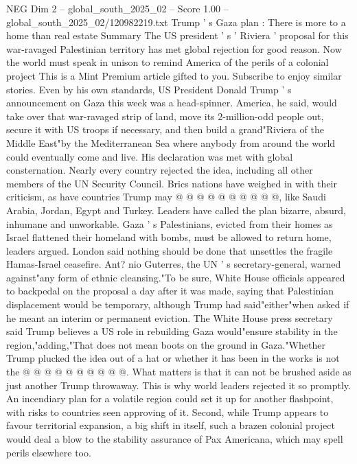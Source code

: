 \begin{textsample}{NEG Dim 2 – global\_south\_2025\_02 – Score 1.00 – global\_south\_2025\_02/120982219.txt}  \label{ex:f2_neg_028}
Trump ' s Gaza plan : There is more to a home than real estate Summary The US president ' s ' Riviera ' proposal for this war-ravaged Palestinian territory has met global rejection for good reason.
Now the world must speak in unison to remind America of the perils of a colonial project This is a Mint Premium article gifted to you.
Subscribe to enjoy similar stories.
Even by his own standards, US President Donald Trump ' s announcement on Gaza this week was a head-spinner.
America, he said, would take over that war-ravaged strip of land, move its 2-million-odd people out, secure it with US troops if necessary, and then build a grand"Riviera of the Middle East"by the Mediterranean Sea where anybody from around the world could eventually come and live.
His declaration was met with global consternation.
Nearly every country rejected the idea, including all other members of the UN Security Council.
Brics nations have weighed in with their criticism, as have countries Trump may @ @ @ @ @ @ @ @ @ @, like Saudi Arabia, Jordan, Egypt and Turkey.
Leaders have called the plan bizarre, absurd, inhumane and unworkable.
Gaza ' s Palestinians, evicted from their homes as Israel flattened their homeland with bombs, must be allowed to return home, leaders argued.
London said nothing should be done that unsettles the fragile Hamas-Israel ceasefire.
Ant? nio Guterres, the UN ' s secretary-general, warned against"any form of ethnic cleansing."To be sure, White House officials appeared to backpedal on the proposal a day after it was made, saying that Palestinian displacement would be temporary, although Trump had said"either"when asked if he meant an interim or permanent eviction.
The White House press secretary said Trump believes a US role in rebuilding Gaza would"ensure stability in the region,"adding,"That does not mean boots on the ground in Gaza."Whether Trump plucked the idea out of a hat or whether it has been in the works is not the @ @ @ @ @ @ @ @ @ @.
What matters is that it can not be brushed aside as just another Trump throwaway.
This is why world leaders rejected it so promptly.
An incendiary plan for a volatile region could set it up for another flashpoint, with risks to countries seen approving of it.
Second, while Trump appears to favour territorial expansion, a big shift in itself, such a brazen colonial project would deal a blow to the stability assurance of Pax Americana, which may spell perils elsewhere too.

\end{textsample}
